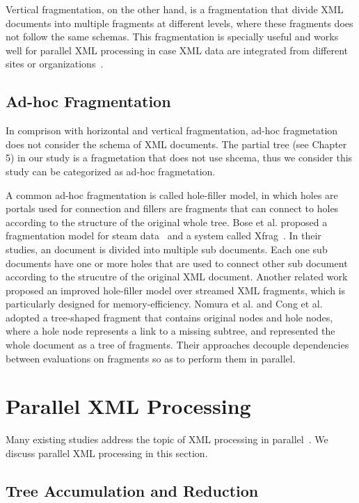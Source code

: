 Vertical fragmentation, on the other hand, is a fragmentation that divide XML
documents into multiple fragments at different levels, where these fragments
does not follow the same schemas. This fragmentation is specially useful and
works well for parallel XML processing in case XML data are integrated from
different sites or organizations~\cite{CFKL12,KlOD10}.


\subsection{Ad-hoc Fragmentation}

In comprison with horizontal and vertical fragmentation, ad-hoc fragmetation
does not consider the schema of XML documents. The partial tree (see Chapter 5)
in our study is a fragmetation that does not use shcema, thus we consider this
study can be categorized as ad-hoc fragmetation.

A common ad-hoc fragmentation is called hole-filler model, in which holes 
are portals used for connection 
and fillers are fragments that can connect to holes according to the structure 
of the original whole tree. Bose et al. proposed a fragmentation model for steam
data~\cite{bose2003query} and a system called Xfrag~\cite{bose2005xfrag}. In
their studies, an document is divided into multiple sub documents. Each one sub
documents have one or more holes that are used to connect other sub document
according to the strucutre of the original XML document. Another related
work~\cite{lee2012memory}  proposed an improved hole-filler model over streamed
XML fragments, which is particularly designed for memory-efficiency. Nomura et
al. \cite{NEMH07} and Cong et al.~\cite{CFKL12} adopted a tree-shaped fragment
that contains original nodes and hole nodes, where a hole node represents a link
to a missing subtree, and represented the whole document as a tree of fragments.
Their approaches decouple dependencies between evaluations on fragments so as to
perform them in parallel.



\section{Parallel XML Processing}
\label{sec:paralleleval}

Many existing studies address the topic of XML processing in
parallel~\cite{BoLS09,PaZC08,LuGa08,Mats09,SAFu05}. We discuss parallel XML
processing in this section.

\subsection{Tree Accumulation and Reduction}

